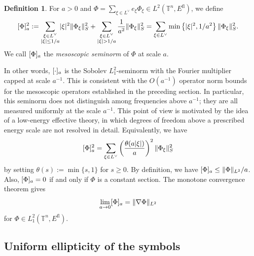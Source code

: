 \documentclass[a4paper,oneside,12pt]{amsart}
\theoremstyle{plain}
\theoremstyle{definition}
\newtheorem{definition}[theorem]{Definition}
\theoremstyle{remark}
\DeclarePairedDelimiter{\abs}{\lvert}{\rvert}
\DeclarePairedDelimiter{\norm}{\lVert}{\rVert}
\DeclarePairedDelimiter{\seminorm}{\lbrack}{\rbrack}
\newcommand{\flattorus}{\mathbb{T}^n}
\newcommand{\Lattice}{L}
\newcommand{\duallattice}[1]{#1^{\vee}}
\newcommand{\Ltwonorm}[2][L^2]{\norm{#2}_{#1}}
\newcommand{\mesoscopicseminorm}[2][a]{\seminorm{#2}_{#1}}
\newcommand{\flatmodel}[1]{#1^{\mathrm{fl}}}
\begin{document}
\begin{definition}\label{definition: mesoscopic seminorm}
  For $a > 0$ and $\Phi = \sum_{\xi \in \duallattice{\Lattice}} e_{\xi} \Phi_{\xi} \in L^2(\flattorus,\flatmodel{E})$, we define
  \begin{equation}
    \mesoscopicseminorm{\Phi}^2 := \sum_{\substack{\xi \in \duallattice{\Lattice} \\ \abs{\xi} \le 1/a}} \abs{\xi}^2 \norm{\Phi_{\xi}}_S^2 + \sum_{\substack{\xi \in \duallattice{\Lattice} \\ \abs{\xi} > 1/a}} \frac{1}{a^2} \norm{\Phi_{\xi}}_S^2 = \sum_{\xi \in \duallattice{\Lattice}} \min \left\{ \abs{\xi}^2, 1/a^2 \right\} \norm{\Phi_{\xi}}_S^2.
  \end{equation}
  We call $\mesoscopicseminorm{\Phi}$ the \emph{mesoscopic seminorm} of $\Phi$ at scale $a$.
\end{definition}
\noindent
In other words, $\mesoscopicseminorm{\cdot}$ is the Sobolev $L^2_1$-seminorm with the Fourier multiplier capped at scale $a^{-1}$.
This is consistent with the $O(a^{-1})$ operator norm bounds for the mesoscopic operators established in the preceding section.
In particular, this seminorm does not distinguish among frequencies above $a^{-1}$; they are all measured uniformly at the scale $a^{-1}$.
This point of view is motivated by the idea of a low-energy effective theory, in which degrees of freedom above a prescribed energy scale are not resolved in detail.
Equivalently, we have
\begin{equation}
  \mesoscopicseminorm{\Phi}^2 = \sum_{\xi \in \duallattice{\Lattice}} \left(\frac{\theta(a\abs{\xi})}{a}\right)^2 \norm{\Phi_{\xi}}_S^2
\end{equation}
by setting $\theta(s) := \min \{s,1\}$ for $s \ge 0$.
By definition, we have $\mesoscopicseminorm{\Phi} \le \Ltwonorm{\Phi}/a$.
Also, $\mesoscopicseminorm{\Phi} = 0$ if and only if $\Phi$ is a constant section.
The monotone convergence theorem gives
\begin{equation}
  \lim_{a \to 0} \mesoscopicseminorm{\Phi} = \Ltwonorm{\nabla \Phi}
\end{equation}
for $\Phi \in L^2_1(\flattorus,\flatmodel{E})$.

\subsection{Uniform ellipticity of the symbols}
\end{document}
